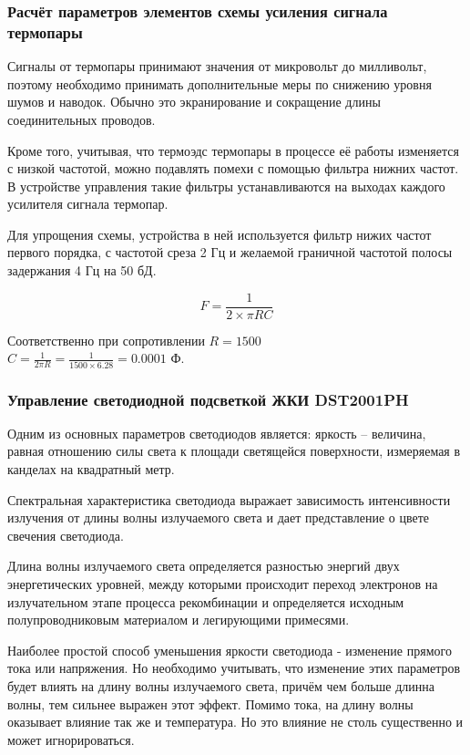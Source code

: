\subsubsection{Расчёт параметров элементов схемы усиления сигнала термопары}
Сигналы от термопары принимают значения от микровольт до милливольт, поэтому необходимо принимать
дополнительные меры по снижению уровня шумов и наводок.
Обычно это экранирование и сокращение длины соединительных проводов.

Кроме того, учитывая, что термоэдс термопары в процессе её работы изменяется
с низкой частотой, можно подавлять помехи с помощью
фильтра нижних частот. В устройстве управления такие фильтры устанавливаются на выходах
каждого усилителя сигнала термопар.

Для упрощения схемы, устройства в ней используется фильтр нижих частот первого порядка, с
частотой среза 2 Гц и желаемой граничной частотой полосы задержания 4 Гц на 50 бД.

\begin{equation}
	F = \frac{1} {2 \times{} \pi{} RC}
\end{equation}

Соответственно при сопротивлении  $R = 1500$ \\
$C = \frac{1}{2\pi{}R} = \frac{1}{1500 \times{} 6.28} = 0.0001$ Ф.

\subsubsection{Управление светодиодной подсветкой ЖКИ DST2001PH}
Одним из основных параметров светодиодов является: яркость -- величина,
равная отношению силы света к площади светящейся
поверхности, измеряемая в канделах на квадратный метр.

Спектральная характеристика светодиода выражает зависимость интенсивности
излучения от длины волны излучаемого света и дает представление о цвете
свечения светодиода.


Длина волны излучаемого света определяется разностью
энергий двух энергетических уровней, между которыми происходит переход
электронов на излучательном этапе процесса рекомбинации и определяется
исходным полупроводниковым материалом и легирующими примесями.

Наиболее простой способ уменьшения яркости светодиода - изменение прямого
тока или напряжения. Но необходимо учитывать, что изменение этих параметров будет
влиять на длину волны излучаемого света, причём чем больше длинна волны, тем сильнее
выражен этот эффект. Помимо тока, на длину волны оказывает влияние так же и температура.
Но это влияние не столь существенно и может игнорироваться.


